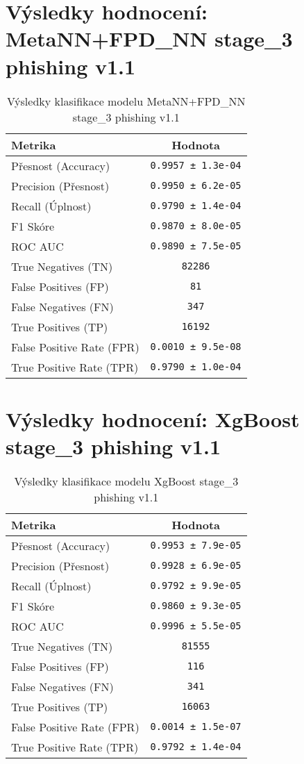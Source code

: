 \section*{Výsledky hodnocení: MetaNN+FPD_NN stage_3 phishing v1.1}
\begin{table}[h!]
\centering
\begin{tabular}{|l|c|}
\hline
\textbf{Metrika} & \textbf{Hodnota} \\
\hline
Přesnost (Accuracy) & \texttt{0.9957 ± 1.3e-04} \\
Precision (Přesnost) & \texttt{0.9950 ± 6.2e-05} \\
Recall (Úplnost) & \texttt{0.9790 ± 1.4e-04} \\
F1 Skóre & \texttt{0.9870 ± 8.0e-05} \\
ROC AUC & \texttt{0.9890 ± 7.5e-05} \\
True Negatives (TN) & \texttt{82286} \\
False Positives (FP) & \texttt{81} \\
False Negatives (FN) & \texttt{347} \\
True Positives (TP) & \texttt{16192} \\
False Positive Rate (FPR) & \texttt{0.0010 ± 9.5e-08} \\
True Positive Rate (TPR) & \texttt{0.9790 ± 1.0e-04} \\
\hline
\end{tabular}
\caption{Výsledky klasifikace modelu MetaNN+FPD_NN stage_3 phishing v1.1}
\label{tab:phishing_metann+fpd_nn}
\end{table}

\section*{Výsledky hodnocení: XgBoost stage_3 phishing v1.1}
\begin{table}[h!]
\centering
\begin{tabular}{|l|c|}
\hline
\textbf{Metrika} & \textbf{Hodnota} \\
\hline
Přesnost (Accuracy) & \texttt{0.9953 ± 7.9e-05} \\
Precision (Přesnost) & \texttt{0.9928 ± 6.9e-05} \\
Recall (Úplnost) & \texttt{0.9792 ± 9.9e-05} \\
F1 Skóre & \texttt{0.9860 ± 9.3e-05} \\
ROC AUC & \texttt{0.9996 ± 5.5e-05} \\
True Negatives (TN) & \texttt{81555} \\
False Positives (FP) & \texttt{116} \\
False Negatives (FN) & \texttt{341} \\
True Positives (TP) & \texttt{16063} \\
False Positive Rate (FPR) & \texttt{0.0014 ± 1.5e-07} \\
True Positive Rate (TPR) & \texttt{0.9792 ± 1.4e-04} \\
\hline
\end{tabular}
\caption{Výsledky klasifikace modelu XgBoost stage_3 phishing v1.1}
\label{tab:phishing_xgboost}
\end{table}

